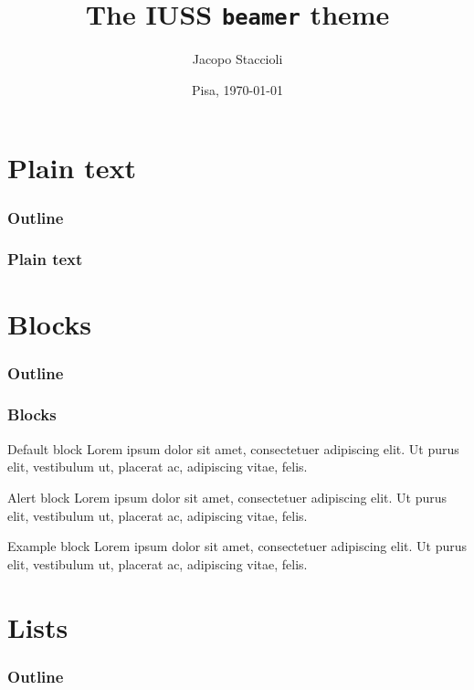 \documentclass{beamer}
\title[The IUSS \texttt{beamer} theme]{The IUSS \texttt{beamer} theme}
\author[Jacopo Staccioli]{Jacopo Staccioli}
\institute{\href{mailto:j.staccioli@santannapisa.it}{\texttt{j.staccioli<at>santannapisa.it}}}
\date[\today]{Pisa, \today}
\begin{document}
\begin{frame}
\maketitle
\end{frame}

\section{\bfseries Plain text}

\begin{frame}
\frametitle{Outline}
\tableofcontents[currentsection]
\end{frame}

\begin{frame}
\frametitle{Plain text}
\lipsum[1]
\end{frame}

\section{\bfseries Blocks}

\begin{frame}
\frametitle{Outline}
\tableofcontents[currentsection]
\end{frame}

\begin{frame}
\frametitle{Blocks}
\begin{block}{Default block}
Lorem ipsum dolor sit amet, consectetuer adipiscing elit. Ut purus elit, vestibulum ut, placerat ac, adipiscing vitae, felis.
\end{block}
\begin{alertblock}{Alert block}
Lorem ipsum dolor sit amet, consectetuer adipiscing elit. Ut purus elit, vestibulum ut, placerat ac, adipiscing vitae, felis.
\end{alertblock}
\begin{exampleblock}{Example block}
Lorem ipsum dolor sit amet, consectetuer adipiscing elit. Ut purus elit, vestibulum ut, placerat ac, adipiscing vitae, felis.
\end{exampleblock}
\end{frame}

\section{\bfseries Lists}

\begin{frame}
\frametitle{Outline}
\tableofcontents[currentsection]
\end{frame}
\end{document}
